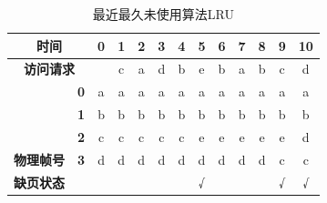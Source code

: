 \begin{table}[H]
	\centering
	\begin{tabular}{|clc|c|c|c|c|c|c|c|c|c|c|c|}
		\hline
		\multicolumn{3}{|c|}{\textbf{时间}}                       & \textbf{0} & \textbf{1}               & \textbf{2}               & \textbf{3}               & \textbf{4}               & \textbf{5}               & \textbf{6}               & \textbf{7}               & \textbf{8}               & \textbf{9}               & \textbf{10}                                         \\ \hline
		\multicolumn{3}{|c|}{\textbf{访问请求}}                   &            & c                        & a                        & d                        & b                        & e                        & b                        & a                        & b                        & c                        & d                                                   \\ \hline
		\multicolumn{2}{|c|}{}                                    & \textbf{0} & {\color[HTML]{333333} a} & {\color[HTML]{333333} a} & {\color[HTML]{FE0000} a} & {\color[HTML]{333333} a} & {\color[HTML]{333333} a} & {\color[HTML]{333333} a} & {\color[HTML]{333333} a} & {\color[HTML]{FE0000} a} & {\color[HTML]{333333} a} & {\color[HTML]{333333} a} & {\color[HTML]{333333} a} \\ \cline{3-14}
		\multicolumn{2}{|c|}{}                                    & \textbf{1} & {\color[HTML]{333333} b} & {\color[HTML]{333333} b} & {\color[HTML]{333333} b} & {\color[HTML]{333333} b} & {\color[HTML]{FE0000} b} & {\color[HTML]{333333} b} & {\color[HTML]{FE0000} b} & {\color[HTML]{333333} b} & {\color[HTML]{FE0000} b} & {\color[HTML]{333333} b} & {\color[HTML]{333333} b} \\ \cline{3-14}
		\multicolumn{2}{|c|}{}                                    & \textbf{2} & {\color[HTML]{333333} c} & {\color[HTML]{FE0000} c} & {\color[HTML]{333333} c} & {\color[HTML]{333333} c} & {\color[HTML]{333333} c} & {\color[HTML]{FE0000} e} & {\color[HTML]{333333} e} & {\color[HTML]{333333} e} & {\color[HTML]{333333} e} & {\color[HTML]{333333} e} & {\color[HTML]{FE0000} d} \\ \cline{3-14}
		\multicolumn{2}{|c|}{\multirow{-4}{*}{\textbf{物理帧号}}} & \textbf{3} & {\color[HTML]{333333} d} & {\color[HTML]{333333} d} & {\color[HTML]{333333} d} & {\color[HTML]{FE0000} d} & {\color[HTML]{333333} d} & {\color[HTML]{333333} d} & {\color[HTML]{333333} d} & {\color[HTML]{333333} d} & {\color[HTML]{333333} d} & {\color[HTML]{FE0000} c} & {\color[HTML]{333333} c} \\ \hline
		\multicolumn{2}{|c|}{\textbf{缺页状态}}                   &            &                          &                          &                          &                          &                          & √                        &                          &                          &                          & √                        & √                        \\ \hline
	\end{tabular}
	\caption{最近最久未使用算法LRU}
\end{table}

